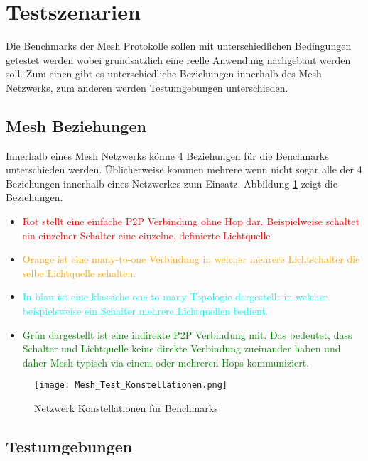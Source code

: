	\clearpage
\section{Testszenarien}\label{sec:Testszenarien}

Die Benchmarks der Mesh Protokolle sollen mit unterschiedlichen Bedingungen getestet werden wobei grundsätzlich eine reelle Anwendung nachgebaut werden soll. Zum einen gibt es unterschiedliche Beziehungen innerhalb des Mesh Netzwerks, zum anderen werden Testumgebungen unterschieden.

\subsection{Mesh Beziehungen}\label{subsec:MeshBeziehungen}

Innerhalb eines Mesh Netzwerks könne 4 Beziehungen für die Benchmarks unterschieden werden. Üblicherweise kommen mehrere wenn nicht sogar alle der 4 Beziehungen innerhalb eines Netzwerkes zum Einsatz. Abbildung \ref{fig:MeshTestKonstellationen} zeigt die Beziehungen.

\begin{itemize}
 	\item \textcolor{red}{Rot stellt eine einfache P2P Verbindung ohne Hop dar. Beispielweise schaltet ein einzelner Schalter eine einzelne, definierte Lichtquelle}
 	\item \textcolor{orange}{Orange ist eine many-to-one Verbindung in welcher mehrere Lichtschalter die selbe Lichtquelle schalten.}
 	\item \textcolor{cyan}{In blau ist eine klassiche one-to-many Topologie dargestellt in welcher beispielsweise ein Schalter mehrere Lichtquellen bedient.}
 	 \item \textcolor{green}{Grün dargestellt ist eine indirekte P2P Verbindung mit. Das bedeutet, dass Schalter und Lichtquelle keine direkte Verbindung zueinander haben und daher Mesh-typisch via einem oder mehreren Hops kommuniziert.}
\end{itemize}

\begin{figure}[H]
	\centering
	\texttt{[image: Mesh\_Test\_Konstellationen.png]}
	\caption{Netzwerk Konstellationen für Benchmarks}\label{fig:MeshTestKonstellationen}
\end{figure}


\subsection{Testumgebungen}\label{subsec:Testumgebungen}

